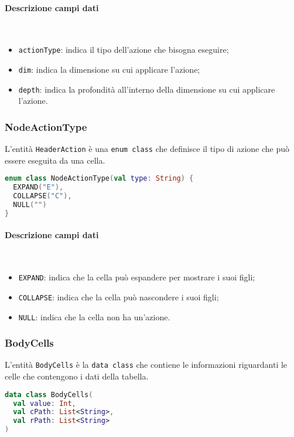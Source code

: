 \paragraph{Descrizione campi dati} \mbox{} \\
\begin{itemize}
	\item \verb|actionType|:  indica il tipo dell'azione che bisogna eseguire;
	\item \verb|dim|: indica la dimensione su cui applicare l'azione;
	\item \verb|depth|: indica la profondità all'interno della dimensione su cui applicare l'azione.
\end{itemize}

\subsubsection{NodeActionType}
L'entità \verb|HeaderAction| è una \verb|enum class| che definisce il tipo di azione che può essere eseguita da una cella.
\begin{lstlisting}[caption={NodeActionType}, label={lst:nodeactiontype}, language=Kotlin]
enum class NodeActionType(val type: String) {
  EXPAND("E"),
  COLLAPSE("C"),
  NULL("")
}
\end{lstlisting}
\paragraph{Descrizione campi dati} \mbox{} \\
\begin{itemize}
	\item \verb|EXPAND|:  indica che la cella può espandere per mostrare i suoi figli;
	\item \verb|COLLAPSE|: indica che la cella può nascondere i suoi figli;
	\item \verb|NULL|: indica che la cella non ha un'azione.
\end{itemize}

\subsubsection{BodyCells}
L'entità \verb|BodyCells| è la \verb|data class| che contiene le informazioni riguardanti le celle che contengono i dati della tabella.
\begin{lstlisting}[caption={BodyCells}, label={lst:bodycells}, language=Kotlin]
data class BodyCells(
  val value: Int,
  val cPath: List<String>,
  val rPath: List<String>
)
\end{lstlisting}
